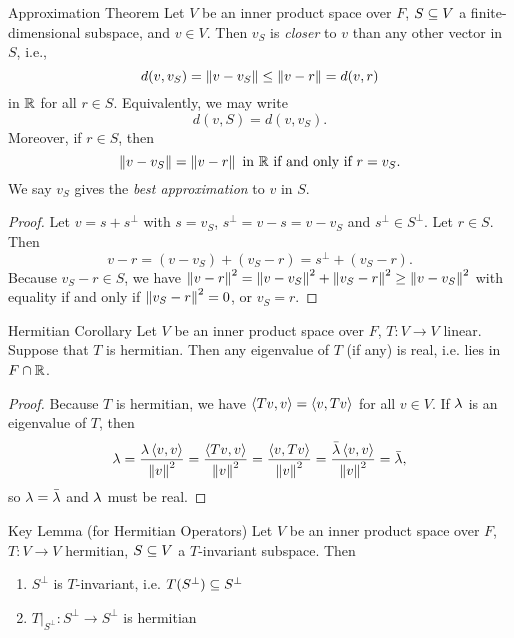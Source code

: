 \documentclass[class=article, crop=false]{standalone}
\begin{document}
  \newpage
  \begin{theorem}{Approximation Theorem}
    Let $V$ be an inner product space over $F$, $S\subseteq V$ a finite-dimensional subspace, and $v\in V$. Then $v_S$ is \emph{closer} to $v$ than any other vector in $S$, i.e.,
    \[
      d(v, v_S) = \left\lVert v - v_S\right\rVert \leq \left\lVert v - r\right\rVert = d(v, r)
    \]
    in $\mathbb{R}$ for all $r\in S$. Equivalently, we may write
    \[
      d(v, S) = d(v, v_S).
    \]
    Moreover, if $r\in S$, then
    \[
      \left\lVert v - v_S\right\rVert = \left\lVert v - r\right\rVert\text{ in $\mathbb{R}$ if and only if }r = v_S.
    \]
    We say $v_S$ gives the \emph{best approximation} to $v$ in $S$.
  \end{theorem}
  \begin{proof}
    Let $v = s + s^\perp$ with $s = v_S$, $s^\perp = v - s = v - v_S$ and $s^\perp\in S^\perp$. Let $r\in S$. Then
    \[
      v - r = (v - v_S) + (v_S - r) = s^\perp + (v_S - r).
    \]
    Because $v_S - r\in S$, we have $\left\lVert v - r\right\rVert^2 = \left\lVert v - v_S\right\rVert^2 + \left\lVert v_S - r\right\rVert^2\geq \left\lVert v - v_S\right\rVert^2$ with equality if and only if $\left\lVert v_S - r\right\rVert^2 = 0$, or $v_S = r$.
  \end{proof}
  \newpage
  \begin{theorem}{Hermitian Corollary}
    Let $V$ be an inner product space over $F$, $T\colon V\to V$ linear. Suppose that $T$ is hermitian. Then any eigenvalue of $T$ (if any) is real, i.e. lies in $F\cap \mathbb{R}$.
  \end{theorem}
  \begin{proof}
    Because $T$ is hermitian, we have $\left\langle Tv, v \right\rangle = \left\langle v, Tv \right\rangle$ for all $v\in V$. If $\lambda$ is an eigenvalue of $T$, then
    \[
      \lambda = \frac{\lambda \left\langle v, v \right\rangle}{\left\lVert v\right\rVert^2} = \frac{\left\langle Tv, v \right\rangle}{\left\lVert v\right\rVert^2} = \frac{\left\langle v, Tv \right\rangle}{\left\lVert v\right\rVert^2} = \frac{\bar{\lambda}\left\langle v, v \right\rangle}{\left\lVert v\right\rVert^2} = \bar{\lambda},
    \]
    so $\lambda = \bar{\lambda}$ and $\lambda$ must be real.
  \end{proof}
  \newpage
  \begin{theorem}{Key Lemma (for Hermitian Operators)}
    Let $V$ be an inner product space over $F$, $T\colon V\to V$ hermitian, $S\subseteq V$ a $T$-invariant subspace. Then
    \begin{enumerate}[label=(\roman*)]
      \item $S^\perp$ is $T$-invariant, i.e. $T(S^\perp)\subseteq S^\perp$
      \item $T|_{S^\perp}\colon S^\perp\to S^\perp$ is hermitian
    \end{enumerate}
  \end{theorem}
\end{document}
